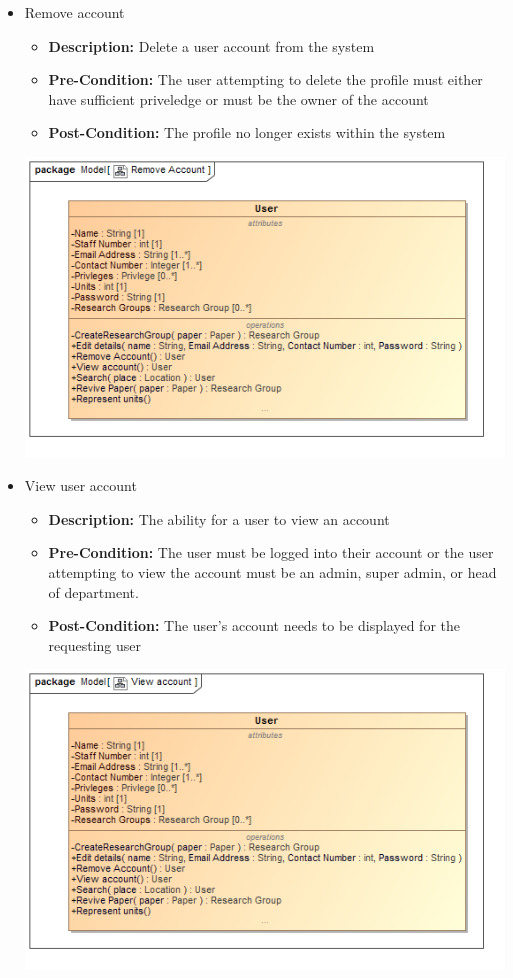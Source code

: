 \documentclass[11pt]{article}
\begin{document}
\begin{itemize}
\begin{center}
		\end{center}
		\item Remove account
		\begin{itemize}
			\item \textbf{Description: }Delete a user account from the system
			\item \textbf{Pre-Condition: }The user attempting to delete the profile must either have sufficient priveledge or must be the owner of the account
			\item \textbf{Post-Condition: }The profile no longer exists within the system
		\end{itemize}
		\begin{center}
			\includegraphics[width=\textwidth]{../DomainModel/RemoveAccount.png}\\[0.5cm]
		\end{center}
		\item View user account
		\begin{itemize}
			\item \textbf{Description: }The ability for a user to view an account
			\item \textbf{Pre-Condition: }The user must be logged into their account or the user attempting to view the account must be an admin, super admin, or head of department.
			\item \textbf{Post-Condition: }The user's account needs to be displayed for the requesting user
		\end{itemize}
		\begin{center}
			\includegraphics[width=\textwidth]{../DomainModel/Viewaccount.png}\\[0.5cm]

\end{center}
\end{itemize}
\end{document}
